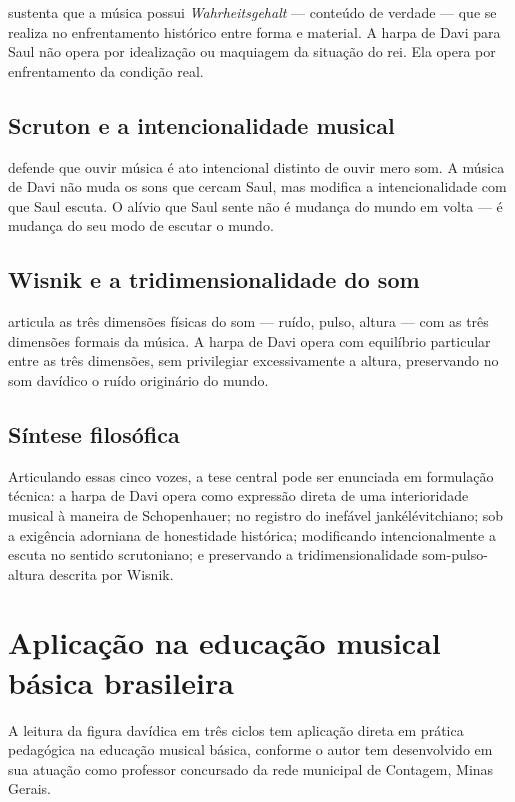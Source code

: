 \documentclass[12pt,a4paper]{article}
\begin{document}
\citet{Adorno2018} sustenta que a música possui \emph{Wahrheitsgehalt} --- conteúdo de verdade --- que se realiza no enfrentamento histórico entre forma e material. A harpa de Davi para Saul não opera por idealização ou maquiagem da situação do rei. Ela opera por enfrentamento da condição real.

\subsection{Scruton e a intencionalidade musical}

\citet{Scruton1997} defende que ouvir música é ato intencional distinto de ouvir mero som. A música de Davi não muda os sons que cercam Saul, mas modifica a intencionalidade com que Saul escuta. O alívio que Saul sente não é mudança do mundo em volta --- é mudança do seu modo de escutar o mundo.

\subsection{Wisnik e a tridimensionalidade do som}

\citet{Wisnik1989} articula as três dimensões físicas do som --- ruído, pulso, altura --- com as três dimensões formais da música. A harpa de Davi opera com equilíbrio particular entre as três dimensões, sem privilegiar excessivamente a altura, preservando no som davídico o ruído originário do mundo.

\subsection{Síntese filosófica}

Articulando essas cinco vozes, a tese central pode ser enunciada em formulação técnica: a harpa de Davi opera como expressão direta de uma interioridade musical à maneira de Schopenhauer; no registro do inefável jankélévitchiano; sob a exigência adorniana de honestidade histórica; modificando intencionalmente a escuta no sentido scrutoniano; e preservando a tridimensionalidade som-pulso-altura descrita por Wisnik.

\section{Aplicação na educação musical básica brasileira}

A leitura da figura davídica em três ciclos tem aplicação direta em prática pedagógica na educação musical básica, conforme o autor tem desenvolvido em sua atuação como professor concursado da rede municipal de Contagem, Minas Gerais.
\end{document}
